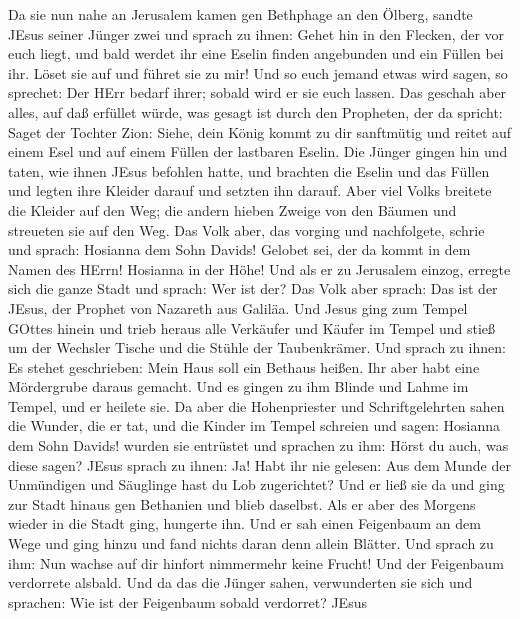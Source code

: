  Da sie nun nahe an Jerusalem kamen gen Bethphage an den
Ölberg, sandte JEsus seiner Jünger zwei  und sprach zu
ihnen: Gehet hin in den Flecken, der vor euch liegt, und bald werdet ihr
eine Eselin finden angebunden und ein Füllen bei ihr. Löset sie auf und
führet sie zu mir!  Und so euch jemand etwas wird sagen, so
sprechet: Der HErr bedarf ihrer; sobald wird er sie euch lassen.
 Das geschah aber alles, auf daß erfüllet würde, was gesagt
ist durch den Propheten, der da spricht:  Saget der Tochter
Zion: Siehe, dein König kommt zu dir sanftmütig und reitet auf einem
Esel und auf einem Füllen der lastbaren Eselin.  Die Jünger
gingen hin und taten, wie ihnen JEsus befohlen hatte,  und
brachten die Eselin und das Füllen und legten ihre Kleider darauf und
setzten ihn darauf.  Aber viel Volks breitete die Kleider
auf den Weg; die andern hieben Zweige von den Bäumen und streueten sie
auf den Weg.  Das Volk aber, das vorging und nachfolgete,
schrie und sprach: Hosianna dem Sohn Davids! Gelobet sei, der da kommt
in dem Namen des HErrn! Hosianna in der Höhe!  Und als er
zu Jerusalem einzog, erregte sich die ganze Stadt und sprach: Wer ist
der?  Das Volk aber sprach: Das ist der JEsus, der Prophet
von Nazareth aus Galiläa.  Und Jesus ging zum Tempel GOttes
hinein und trieb heraus alle Verkäufer und Käufer im Tempel und stieß um
der Wechsler Tische und die Stühle der Taubenkrämer.  Und
sprach zu ihnen: Es stehet geschrieben: Mein Haus soll ein Bethaus
heißen. Ihr aber habt eine Mördergrube daraus gemacht.  Und
es gingen zu ihm Blinde und Lahme im Tempel, und er heilete sie.
 Da aber die Hohenpriester und Schriftgelehrten sahen die
Wunder, die er tat, und die Kinder im Tempel schreien und sagen:
Hosianna dem Sohn Davids! wurden sie entrüstet  und
sprachen zu ihm: Hörst du auch, was diese sagen? JEsus sprach zu ihnen:
Ja! Habt ihr nie gelesen: Aus dem Munde der Unmündigen und Säuglinge
hast du Lob zugerichtet?  Und er ließ sie da und ging zur
Stadt hinaus gen Bethanien und blieb daselbst.  Als er aber
des Morgens wieder in die Stadt ging, hungerte ihn.  Und er
sah einen Feigenbaum an dem Wege und ging hinzu und fand nichts daran
denn allein Blätter. Und sprach zu ihm: Nun wachse auf dir hinfort
nimmermehr keine Frucht! Und der Feigenbaum verdorrete alsbald.
 Und da das die Jünger sahen, verwunderten sie sich und
sprachen: Wie ist der Feigenbaum sobald verdorret?  JEsus
